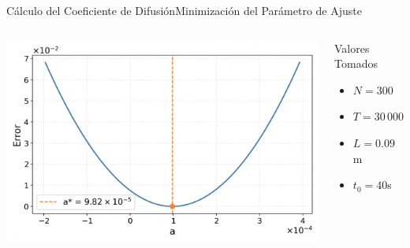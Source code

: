 \documentclass{beamer}
\begin{document}
\begin{frame}{Cálculo del Coeficiente de Difusión}{Minimización del Parámetro de Ajuste}
    \begin{columns}[c]
            \centering
            \includegraphics[height=.50\textheight]{resources/error-difusion.png}
            \begin{minipage}[t]{\linewidth}
                \begin{block}{Valores Tomados}
                    \begin{itemize}
                        \item $N=300$
                        \item $T=30\,000$
                        \item $L=0.09$m
                        \item $t_0=40$s
                    \end{itemize}
                \end{block}
            \end{minipage}
    \end{columns}
\end{frame}
\end{document}
